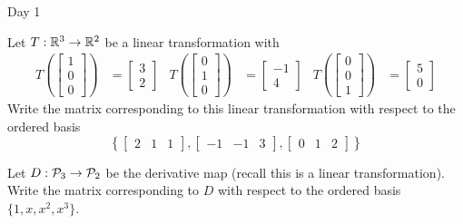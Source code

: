 \begin{applicationActivities}{Day 1}
\begin{activity}
  Let $T: \IR^3 \rightarrow \IR^2$ be a linear transformation with
\begin{align*}
T\left(\begin{bmatrix} 1 \\ 0 \\ 0 \end{bmatrix} \right) &= \begin{bmatrix} 3 \\ 2\end{bmatrix} &
T\left(\begin{bmatrix} 0 \\ 1 \\ 0 \end{bmatrix} \right) &= \begin{bmatrix} -1 \\ 4\end{bmatrix} &
T\left(\begin{bmatrix} 0 \\ 0 \\ 1 \end{bmatrix} \right) &= \begin{bmatrix} 5 \\ 0\end{bmatrix}
\end{align*}
Write the matrix corresponding to this linear transformation with respect to the ordered basis
\[\left\{ \begin{bmatrix} 2 & 1 & 1 \end{bmatrix} , \begin{bmatrix} -1 & -1 & 3 \end{bmatrix} , \begin{bmatrix} 0 & 1 & 2 \end{bmatrix} \right\}\]
\end{activity}

\begin{activity}
Let $D: \P_3 \rightarrow \P_2$ be the derivative map (recall this is a linear transformation).  Write the matrix corresponding to $D$ with respect to the ordered basis $\{1,x,x^2,x^3\}$.
\end{activity}

\end{applicationActivities}
